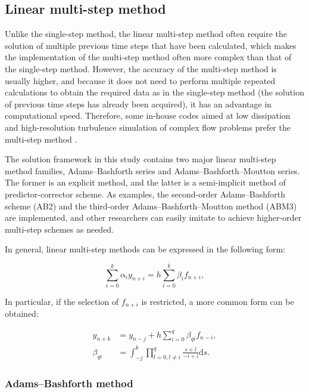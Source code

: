 \documentclass{article}
\begin{document}
\subsection{Linear multi-step method}
\label{ssec:multi}

Unlike the single-step method, the linear multi-step method often require the solution of multiple previous time steps that have been calculated, which makes the implementation of the multi-step method often more complex than that of the single-step method. However, the accuracy of the multi-step method is usually higher, and because it does not need to perform multiple repeated calculations to obtain the required data as in the single-step method (the solution of previous time steps has already been acquired), it has an advantage in computational speed. Therefore, some in-house codes aimed at low dissipation and high-resolution turbulence simulation of complex flow problems prefer the multi-step method \citep{Chain:2015}.

The solution framework in this study contains two major linear multi-step method families, Adams--Bashforth series and Adams--Bashforth--Moutton series. The former is an explicit method, and the latter is a semi-implicit method of predictor-corrector scheme. As examples, the second-order Adams--Bashforth scheme (AB2) and the third-order Adams--Bashforth--Moutton method (ABM3) are implemented, and other researchers can easily imitate to achieve higher-order multi-step schemes as needed.

In general, linear multi-step methods can be expressed in the following form:

\begin{equation}
  \sum_{i=0}^{k} \alpha_i y_{n+i} = h \sum_{i=0}^{k} \beta_i f_{n+i},
\end{equation}

In particular, if the selection of $f_{n+i}$ is restricted, a more common form can be obtained:

\begin{equation}
  \begin{aligned}
    y_{n+k} &= y_{n-j} + h \sum_{i=0}^{q} \beta_{qi} f_{n-i},  \\
    \beta_{qi} &= \int_{-j}^k \prod_{l = 0, l \neq i}^{q} \frac{s+l}{-i+l} \mathrm{d}s.
  \end{aligned}
\end{equation}


\subsubsection{Adams--Bashforth method}
\end{document}
